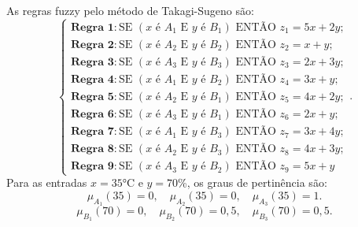 As regras fuzzy pelo método de Takagi-Sugeno são:
$$
\begin{cases}
  \textbf{Regra 1}: \text{SE } (x \text{ é } A_1 \text{ E } y \text{ é } B_1) \text{ ENTÃO } z_1 = 5x + 2y; \\
  \textbf{Regra 2}: \text{SE } (x \text{ é } A_2 \text{ E } y \text{ é } B_2) \text{ ENTÃO } z_2 = x + y; \\
  \textbf{Regra 3}: \text{SE } (x \text{ é } A_3 \text{ E } y \text{ é } B_3) \text{ ENTÃO } z_3 = 2x + 3y; \\
  \textbf{Regra 4}: \text{SE } (x \text{ é } A_1 \text{ E } y \text{ é } B_2) \text{ ENTÃO } z_4 = 3x + y; \\
  \textbf{Regra 5}: \text{SE } (x \text{ é } A_2 \text{ E } y \text{ é } B_1) \text{ ENTÃO } z_5 = 4x + 2y; \\
  \textbf{Regra 6}: \text{SE } (x \text{ é } A_3 \text{ E } y \text{ é } B_1) \text{ ENTÃO } z_6 = 2x + y; \\
  \textbf{Regra 7}: \text{SE } (x \text{ é } A_1 \text{ E } y \text{ é } B_3) \text{ ENTÃO } z_7 = 3x + 4y; \\
  \textbf{Regra 8}: \text{SE } (x \text{ é } A_2 \text{ E } y \text{ é } B_3) \text{ ENTÃO } z_8 = 4x + 3y; \\
  \textbf{Regra 9}: \text{SE } (x \text{ é } A_3 \text{ E } y \text{ é } B_2) \text{ ENTÃO } z_9 = 5x + y
\end{cases}.
$$
Para as entradas $x = 35$°C e $y = 70$\%, os graus de pertinência são:
$$\mu_{A_1}(35) = 0, \quad \mu_{A_2}(35) = 0, \quad \mu_{A_3}(35) = 1.$$
$$\mu_{B_1}(70) = 0, \quad \mu_{B_2}(70) = 0{,}5, \quad \mu_{B_3}(70) = 0{,}5.$$

